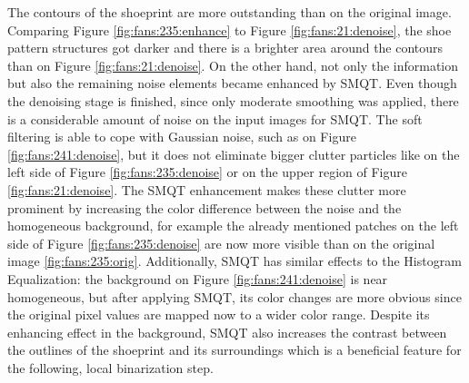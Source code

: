 \documentclass[draft,final]{vutinfth} %
\begin{document}
The contours of the shoeprint are more outstanding than on the original image.
Comparing Figure \ref{fig:fans:235:enhance} to Figure \ref{fig:fans:21:denoise}, the shoe pattern structures got darker and there is a brighter area around the contours than on Figure \ref{fig:fans:21:denoise}.
On the other hand, not only the information but also the remaining noise elements became enhanced by SMQT.
Even though the denoising stage is finished, since only moderate smoothing was applied, there is a considerable amount of noise on the input images for SMQT.
The soft filtering is able to cope with Gaussian noise, such as on Figure \ref{fig:fans:241:denoise}, but it does not eliminate bigger clutter particles like on the left side of Figure \ref{fig:fans:235:denoise} or on the upper region of Figure \ref{fig:fans:21:denoise}.
The SMQT enhancement makes these clutter more prominent by increasing the color difference between the noise and the homogeneous background, for example the already mentioned patches on the left side of Figure \ref{fig:fans:235:denoise} are now more visible than on the original image \ref{fig:fans:235:orig}.
Additionally, SMQT has similar effects to the Histogram Equalization: the background on Figure \ref{fig:fans:241:denoise} is near homogeneous, but after applying SMQT, its color changes are more obvious since the original pixel values are mapped now to a wider color range.
Despite its enhancing effect in the background, SMQT also increases the contrast between the outlines of the shoeprint and its surroundings which is a beneficial feature for the following, local binarization step.
\end{document}
